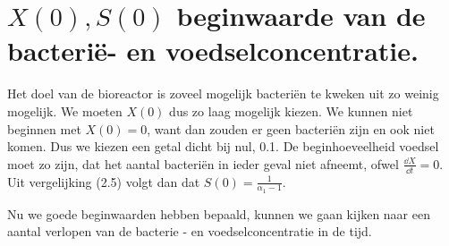 \section{$X(0), S(0)$ beginwaarde van de bacteri\"e- en voedselconcentratie.}
Het doel van de bioreactor is zoveel mogelijk bacteri\"en te kweken uit zo weinig mogelijk. We moeten $X(0)$ dus zo laag mogelijk kiezen. We kunnen niet beginnen met $X(0) = 0$, want dan zouden er geen bacteri\"en zijn en ook niet komen. Dus we kiezen een getal dicht bij nul, 0.1.
De beginhoeveelheid voedsel moet zo zijn, dat het aantal bacteri\"en in ieder geval niet afneemt, ofwel $\frac{\dd X}{\dd t} = 0$. Uit vergelijking (2.5) volgt dan dat $S(0) = \frac{1}{\alpha_1 - 1}$.

Nu we goede beginwaarden hebben bepaald, kunnen we gaan kijken naar een aantal verlopen van de bacterie - en voedselconcentratie in de tijd.
